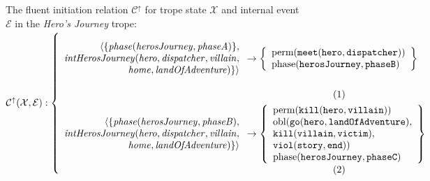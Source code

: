 \documentclass[11pt]{report}
\begin{document}
\begin{figure}[!t]
The fluent initiation relation $\mathcal{C^{\uparrow}}$ for trope state $\mathcal{X}$ and internal event $\mathcal{E}$ in the \emph{Hero's Journey} trope:\\
$\mathcal{C^{\uparrow}(X, E)}:\left\{\mbox{%
\begin{minipage}[c]{0.85\textwidth}
\begin{align}
\begin{array}{r}
                                 \langle \{\mathit{phase(herosJourney, phaseA)}\},\\
  \mathit{intHerosJourney(hero, dispatcher, villain},\\
\mathit{home, landOfAdventure)}\} \rangle
\end{array}
&\rightarrow
\left\{\begin{array}{l}
\text{perm}(\mathtt{meet(hero, dispatcher)})\\
\text{phase}(\mathtt{herosJourney, phaseB})
\end{array}\right\}\label{eq:cfirst}\\
\begin{array}{r}
                                 \langle\{\mathit{phase(herosJourney, phaseB)},\\
  \mathit{intHerosJourney(hero, dispatcher, villain},\\ \mathit{home, landOfAdventure)}\} \rangle\\
  \end{array}
&\rightarrow \left\{
\begin{array}{l}
  \text{perm}(\mathtt{kill(hero, villain)}) \\
\text{obl}(\mathtt{go(hero, landOfAdventure),} \\
\mathtt{kill(villain, victim)},\\
\mathtt{viol(story, end)})\\
\text{phase}(\mathtt{herosJourney, phaseC})
\end{array}
\right\}\label{eq:phaseb}
\end{align}
\end{minipage}
}\right.$\smallskip



\end{figure}
\end{document}
